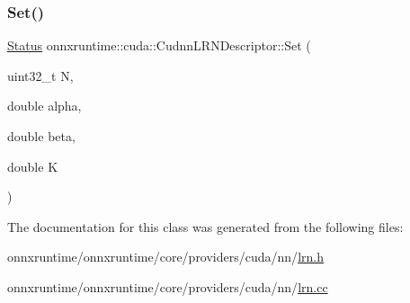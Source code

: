 \mbox{\label{classonnxruntime_1_1cuda_1_1CudnnLRNDescriptor_afef51817e25778067c60d5de09fea530}} 
\subsubsection{\texorpdfstring{Set()}{Set()}}
{\footnotesize\ttfamily \mbox{\hyperlink{classonnxruntime_1_1common_1_1Status}{Status}} onnxruntime\+::cuda\+::\+Cudnn\+L\+R\+N\+Descriptor\+::\+Set (\begin{DoxyParamCaption}\item[{uint32\+\_\+t}]{N,  }\item[{double}]{alpha,  }\item[{double}]{beta,  }\item[{double}]{K }\end{DoxyParamCaption})}



The documentation for this class was generated from the following files\+:\begin{DoxyCompactItemize}
\item 
onnxruntime/onnxruntime/core/providers/cuda/nn/\mbox{\hyperlink{cuda_2nn_2lrn_8h}{lrn.\+h}}\item 
onnxruntime/onnxruntime/core/providers/cuda/nn/\mbox{\hyperlink{cuda_2nn_2lrn_8cc}{lrn.\+cc}}\end{DoxyCompactItemize}
